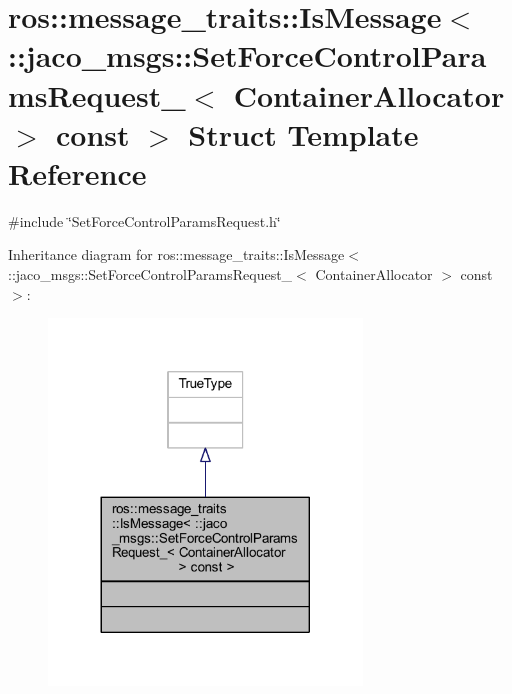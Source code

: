 \hypertarget{structros_1_1message__traits_1_1IsMessage_3_01_1_1jaco__msgs_1_1SetForceControlParamsRequest___36dfc005745f617550309adf362f6b717}{}\section{ros\+:\+:message\+\_\+traits\+:\+:Is\+Message$<$ \+:\+:jaco\+\_\+msgs\+:\+:Set\+Force\+Control\+Params\+Request\+\_\+$<$ Container\+Allocator $>$ const $>$ Struct Template Reference}
\label{structros_1_1message__traits_1_1IsMessage_3_01_1_1jaco__msgs_1_1SetForceControlParamsRequest___36dfc005745f617550309adf362f6b717}


{\ttfamily \#include \char`\"{}Set\+Force\+Control\+Params\+Request.\+h\char`\"{}}



Inheritance diagram for ros\+:\+:message\+\_\+traits\+:\+:Is\+Message$<$ \+:\+:jaco\+\_\+msgs\+:\+:Set\+Force\+Control\+Params\+Request\+\_\+$<$ Container\+Allocator $>$ const $>$\+:
\nopagebreak
\begin{figure}[H]
\begin{center}
\leavevmode
\includegraphics[width=236pt]{d3/dc4/structros_1_1message__traits_1_1IsMessage_3_01_1_1jaco__msgs_1_1SetForceControlParamsRequest___3aba2e88ea67b9e17943be2a642f81a36}
\end{center}
\end{figure}



